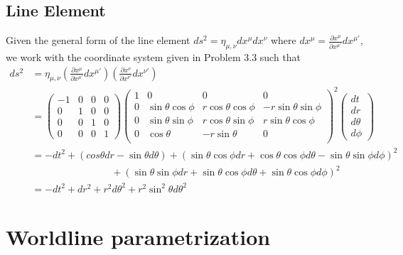 \documentclass{article}
\begin{document}
	\subsection{Line Element}
	Given the general form of the line element $ds^2 = \eta_{\mu, \nu} dx^\mu dx^\nu$ where $dx^\mu = \frac{\partial x^\mu}{\partial x^{\mu '}}dx^{\mu '}$, we work with the coordinate system given in Problem 3.3 such that
	\begin{align*}
	 	ds^2  &= \eta_{\mu, \nu} \left( \frac{\partial x^\mu}{\partial x^{\mu '}} dx^{\mu '} \right)\left( \frac{\partial x^\nu}{\partial x^{\nu '}} dx^{\nu '} \right)\\
	 	&= \begin{pmatrix}
	 		-1 & 0 & 0 & 0 \\
	 		0 & 1 & 0 & 0 \\
	 		0 & 0 & 1 & 0 \\
	 		0 & 0 & 0 & 1
	 	\end{pmatrix}
 		\begin{pmatrix}
 			1 & 0 & 0 & 0 \\
 			0 & \sin \theta \cos \phi & r \cos \theta \cos \phi & -r \sin \theta \sin \phi \\
 			0 & \sin \theta \sin \phi & r \cos \theta \sin \phi & r \sin \theta \cos \phi \\
 			0 & \cos \theta & -r \sin \theta & 0 \\
 		\end{pmatrix}^2
 		\begin{pmatrix}
 			dt \\
 			dr \\
 			d\theta \\
 			d \phi
 		\end{pmatrix} \\
 	&= -dt^2 + \left(cos \theta dr - \sin \theta d \theta \right) + \left( \sin\theta \cos \phi dr + \cos \theta \cos \phi d \theta - \sin \theta \sin \phi d \phi \right)^2\\
 	&\quad\quad\quad\quad\quad\quad\quad\quad + \left( \sin \theta \sin \phi dr + \sin \theta \cos \phi d \theta + \sin \theta \cos \phi d \phi \right)^2 \\
 	&= -dt^2 + dr^2 + r^2 d\theta^2 + r^2 \sin^2 \theta d\theta^2
	 \end{align*}
 
 	\pagebreak
 	
 	\section{Worldline parametrization}
\end{document}
